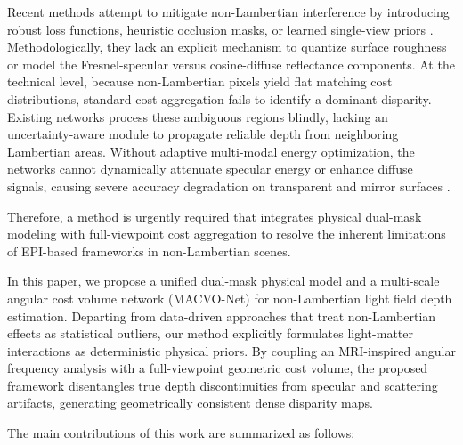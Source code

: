 \documentclass[lettersize,journal]{IEEEtran}
\begin{document}
Recent methods attempt to mitigate non-Lambertian interference by introducing robust loss functions, heuristic occlusion masks, or learned single-view priors \cite{li2021, zhang2023}. Methodologically, they lack an explicit mechanism to quantize surface roughness or model the Fresnel-specular versus cosine-diffuse reflectance components. At the technical level, because non-Lambertian pixels yield flat matching cost distributions, standard cost aggregation fails to identify a dominant disparity. Existing networks process these ambiguous regions blindly, lacking an uncertainty-aware module to propagate reliable depth from neighboring Lambertian areas. Without adaptive multi-modal energy optimization, the networks cannot dynamically attenuate specular energy or enhance diffuse signals, causing severe accuracy degradation on transparent and mirror surfaces \cite{wang2023}.

Therefore, a method is urgently required that integrates physical dual-mask modeling with full-viewpoint cost aggregation to resolve the inherent limitations of EPI-based frameworks in non-Lambertian scenes.

In this paper, we propose a unified dual-mask physical model and a multi-scale angular cost volume network (MACVO-Net) for non-Lambertian light field depth estimation. Departing from data-driven approaches that treat non-Lambertian effects as statistical outliers, our method explicitly formulates light-matter interactions as deterministic physical priors. By coupling an MRI-inspired angular frequency analysis with a full-viewpoint geometric cost volume, the proposed framework disentangles true depth discontinuities from specular and scattering artifacts, generating geometrically consistent dense disparity maps.

The main contributions of this work are summarized as follows:
\end{document}
